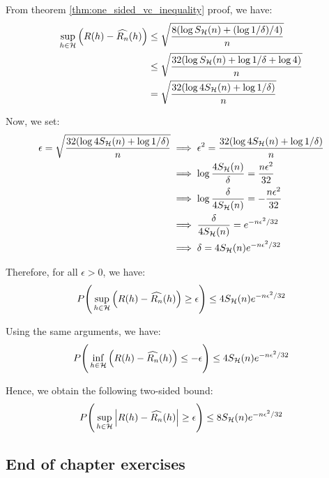 \begin{proof*}
    From theorem \ref{thm:one_sided_vc_inequality} proof, we have:
    \begin{align*}
        \sup_{h\in\mathcal{H}} \Big(  R(h) - \widehat{R_n}(h)  \Big)
        &\le \sqrt{
            \frac{8(\log S_{\mathcal{H}}(n) + (\log 1/\delta)/4)}{n}
        } \\
        &\le \sqrt{
            \frac{32(\log S_{\mathcal{H}}(n) + \log 1/\delta + \log 4)}{n}
        } \\
        &= \sqrt{
            \frac{32(\log4S_{\mathcal{H}}(n) + \log1/\delta)}{n}
        }
    \end{align*}

    \noindent Now, we set:
    \begin{align*}
        \epsilon = \sqrt{
            \frac{32(\log4S_{\mathcal{H}}(n) + \log1/\delta)}{n}
        } 
        &\implies \epsilon^2 = \frac{32(\log4S_{\mathcal{H}}(n) + \log1/\delta)}{n} \\
        &\implies \log\frac{4S_{\mathcal{H}}(n)}{\delta} = \frac{n\epsilon^2}{32} \\
        &\implies \log\frac{\delta}{4S_{\mathcal{H}}(n)} = -\frac{n\epsilon^2}{32} \\
        &\implies \frac{\delta}{4S_{\mathcal{H}}(n)} = e^{-n\epsilon^2/32} \\
        &\implies \delta = 4S_{\mathcal{H}}(n)e^{-n\epsilon^2/32}
    \end{align*}

    \noindent Therefore, for all $\epsilon > 0$, we have:
    \begin{align*}
        P\Bigg( 
            \sup_{h\in\mathcal{H}} \Big( 
                R(h) - \widehat{R_n}(h)
             \Big) \ge \epsilon
         \Bigg) \le 4S_{\mathcal{H}}(n)e^{-n\epsilon^2/32}
    \end{align*}

    \noindent Using the same arguments, we have:
    \begin{align*}
        P\Bigg( 
            \inf_{h\in\mathcal{H}} \Big( 
                R(h) - \widehat{R_n}(h)
             \Big) \le -\epsilon
         \Bigg) \le 4S_{\mathcal{H}}(n)e^{-n\epsilon^2/32}
    \end{align*}

    \noindent Hence, we obtain the following two-sided bound:
    \begin{align*}
        P\Bigg( 
            \sup_{h\in\mathcal{H}}\Big| 
                R(h) - \widehat{R_n}(h)
             \Big| \ge \epsilon
         \Bigg) \le 8S_{\mathcal{H}}(n)e^{-n\epsilon^2/32}
    \end{align*}
\end{proof*}

\newpage
\subsection{End of chapter exercises}
